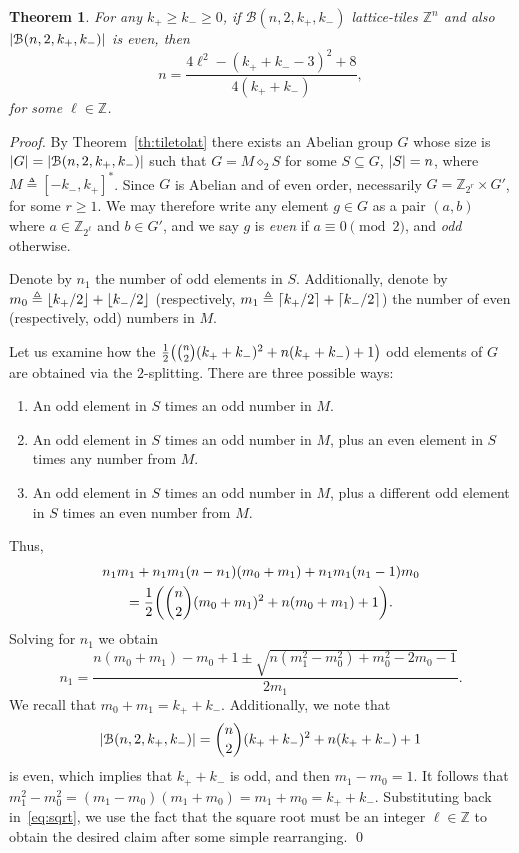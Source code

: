 \documentclass[sort&compress]{elsarticle}
\DeclarePairedDelimiter\abs{\lvert}{\rvert}
\DeclarePairedDelimiter\ceil{\lceil}{\rceil}
\DeclarePairedDelimiter\floor{\lfloor}{\rfloor}
\DeclarePairedDelimiter\parenv{\lparen}{\rparen}
\newcommand{\cB}{\mathcal{B}}
\renewcommand{\geq}{\geqslant}
\newtheorem{theorem}{Theorem}
\newcommand{\Z}{\mathbb{Z}}
\newcommand{\kp}{k_+}
\newcommand{\km}{k_-}
\newcommand{\eqdef}{\triangleq}
\newcommand{\splt}{\diamond}
\begin{document}
\begin{theorem}
  For any $\kp\geq\km\geq 0$, if $\cB(n,2,\kp,\km)$ lattice-tiles
  $\Z^n$ and also $\abs*{\cB(n,2,\kp,\km)}$ is even, then
  \[ n=\frac{4\ell^2-(\kp+\km-3)^2+8}{4(\kp+\km)},\]
  for some $\ell\in\Z$.
\end{theorem}
\begin{proof}
  By Theorem~\ref{th:tiletolat} there exists an Abelian group $G$
  whose size is $\abs*{G}=\abs*{\cB(n,2,\kp,\km)}$ such that
  $G=M\splt_2 S$ for some $S\subseteq G$, $\abs*{S}=n$, where $M\eqdef
  [-\km,\kp]^*$. Since $G$ is Abelian and of even order, necessarily
  $G=\Z_{2^r}\times G'$, for some $r\geq 1$. We may therefore write
  any element $g\in G$ as a pair $(a,b)$ where $a\in\Z_{2^\ell}$ and
  $b\in G'$, and we say $g$ is \emph{even} if $a\equiv 0\pmod{2}$, and
  \emph{odd} otherwise.

  Denote by $n_1$ the number of odd elements in $S$. Additionally,
  denote by $m_0\eqdef \floor{\kp/2}+\floor{\km/2}$ (respectively,
  $m_1\eqdef \ceil{\kp/2}+\ceil{\km/2}$) the number of even
  (respectively, odd) numbers in $M$.

  Let us examine how the
  $\frac{1}{2}\parenv*{\binom{n}{2}(\kp+\km)^2+n(\kp+\km)+1}$ odd
  elements of $G$ are obtained via the $2$-splitting. There are three
  possible ways:
  \begin{enumerate}
  \item
    An odd element in $S$ times an odd number in $M$.
  \item
    An odd element in $S$ times an odd number in $M$,
    plus an even element in $S$ times any number from $M$.
  \item
    An odd element in $S$ times an odd number in $M$, plus a different
    odd element in $S$ times an even number from $M$.
  \end{enumerate}
  Thus,
  \begin{multline*}
    n_1 m_1+n_1 m_1 (n-n_1) (m_0+m_1)+n_1 m_1(n_1-1)m_0\\
    =\frac{1}{2}\parenv*{\binom{n}{2}(m_0+m_1)^2+n(m_0+m_1)+1}.
  \end{multline*}
  Solving for $n_1$ we obtain
  \begin{equation}
    \label{eq:sqrt}
    n_1 = \frac{n(m_0+m_1)-m_0+1\pm\sqrt{n(m_1^2-m_0^2)+m_0^2-2m_0-1}}{2m_1}.
  \end{equation}
  We recall that $m_0+m_1=\kp+\km$. Additionally, we note that
  \[\abs*{\cB(n,2,\kp,\km)}=\binom{n}{2}(\kp+\km)^2+n(\kp+\km)+1\]
  is even, which implies that $\kp+\km$ is odd, and then
  $m_1-m_0=1$. It follows that
  $m_1^2-m_0^2=(m_1-m_0)(m_1+m_0)=m_1+m_0=\kp+\km$. Substituting back
  in~\eqref{eq:sqrt}, we use the fact that the square root must be an
  integer $\ell\in\Z$ to obtain the desired claim after some simple
  rearranging.  \qed\end{proof}
\end{document}

